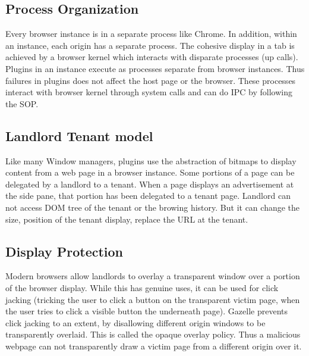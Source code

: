 \documentclass[11pt]{article} %
\begin{document}
\subsection{Process Organization}
Every browser instance is in a separate process like Chrome. In addition, within
an instance, each origin has a separate process. The cohesive display in a tab
is achieved by a browser kernel which interacts with disparate processes (up calls).
Plugins in an instance execute as processes separate from browser instances. Thus
failures in plugins does not affect the host page or the browser. These processes
interact with browser kernel through system calls and can do IPC by following the SOP.

\subsection {Landlord Tenant model}
Like many Window managers, plugins use the abstraction of bitmaps to display content
from a web page in a browser instance. Some portions of a page can be delegated by
a landlord to a tenant. When a page displays an advertisement at the side pane, that
portion has been delegated to a tenant page. Landlord can not access DOM tree of
the tenant or the browing history. But it can change the size, position of the
tenant display, replace the URL at the tenant.

\subsection {Display Protection}
Modern browsers allow landlords to overlay a transparent window over a portion
of the browser display. While this has genuine uses, it can be used for click
jacking (tricking the user to click a button on the transparent victim page, when
the user tries to click a visible button the underneath page). Gazelle prevents
click jacking to an extent, by disallowing different origin windows to be
transparently overlaid. This is called the opaque overlay policy. Thus a malicious
webpage can not transparently draw a victim page from a different origin over it.
\end{document}

